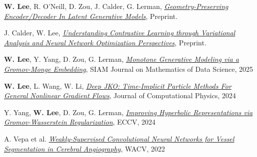 

\begin{cvparagraph}

\vspace{0.7cm}

\begin{cvitems}
  \item \textbf{W. Lee}, R. O'Neill, D. Zou, J. Calder, G. Lerman, \href{https://arxiv.org/abs/2501.09876}{\textit{Geometry-Preserving Encoder/Decoder In Latent Generative Models}}, {Preprint.} %
    \medskip
  \item J. Calder, {W. Lee}, \href{https://openreview.net/pdf?id=qjoDJjVZxB}{\textit{Understanding Contrastive Learning through Variational Analysis and Neural Network Optimization Perspectives}}, {Preprint.}
    \medskip
  \item \textbf{W. Lee}, Y. Yang, D. Zou, G. Lerman, \href{https://arxiv.org/abs/2311.01375}{\textit{Monotone Generative Modeling via a Gromov-Monge Embedding}}, SIAM Journal on Mathematics of Data Science, 2025
    \medskip
    \item \textbf{W. Lee}, L. Wang, W. Li, \href{https://arxiv.org/abs/2311.06700}{\textit{Deep JKO: Time-Implicit Particle Methods For General Nonlinear Gradient Flows}}, Journal of Computational Physics, 2024
    \medskip
  \item Y. Yang, \textbf{W. Lee}, D. Zou, G. Lerman, \href{http://arxiv.org/abs/2407.10495}{\textit{Improving Hyperbolic Representations via Gromov-Wasserstein Regularization}}, ECCV, 2024
    \medskip
    \item A. Vepa et al. \href{https://openaccess.thecvf.com/content/WACV2022/html/Vepa_Weakly-Supervised_Convolutional_Neural_Networks_for_Vessel_Segmentation_in_Cerebral_Angiography_WACV_2022_paper.html}{\textit{Weakly-Supervised Convolutional Neural Networks for Vessel Segmentation in Cerebral Angiography}}, WACV, 2022
    \medskip
  \end{cvitems}
  \vspace{0.5cm}
\end{cvparagraph}